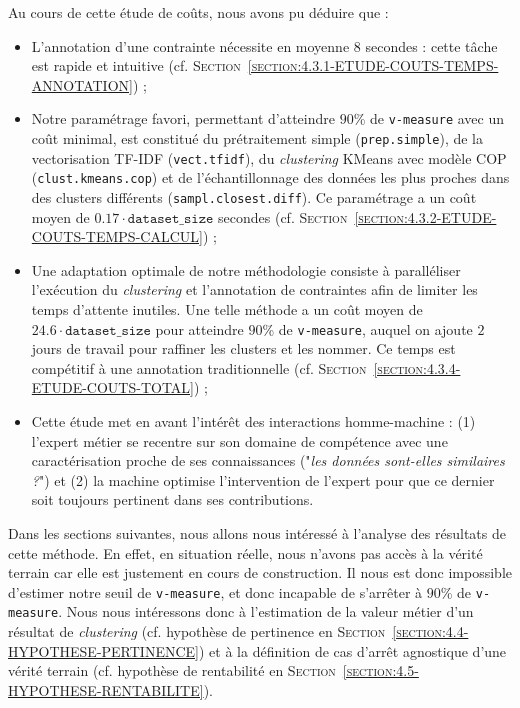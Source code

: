 			\begin{leftBarSummary}
				Au cours de cette étude de coûts, nous avons pu déduire que :
				\begin{itemize}
					\item[\itemok] L'annotation d'une contrainte nécessite en moyenne $8$ secondes : cette tâche est rapide et intuitive (cf. \textsc{Section~\ref{section:4.3.1-ETUDE-COUTS-TEMPS-ANNOTATION}}) ;
					\item[\itemok] Notre paramétrage favori, permettant d'atteindre $90$\% de \texttt{v-measure} avec un coût minimal, est constitué du prétraitement simple (\texttt{prep.simple}), de la vectorisation TF-IDF (\texttt{vect.tfidf}), du \textit{clustering} KMeans avec modèle COP (\texttt{clust.kmeans.cop}) et de l'échantillonnage des données les plus proches dans des clusters différents (\texttt{sampl.closest.diff}). Ce paramétrage a un coût moyen de $0.17 \cdot \texttt{dataset\_size}$ secondes (cf. \textsc{Section~\ref{section:4.3.2-ETUDE-COUTS-TEMPS-CALCUL}}) ;
					\item[\itemok] Une adaptation optimale de notre méthodologie consiste à paralléliser l'exécution du \textit{clustering} et l'annotation de contraintes afin de limiter les temps d'attente inutiles. Une telle méthode a un coût moyen de $24.6 \cdot \texttt{dataset\_size}$ pour atteindre $90$\% de \texttt{v-measure}, auquel on ajoute $2$ jours de travail pour raffiner les clusters et les nommer. Ce temps est compétitif à une annotation traditionnelle (cf. \textsc{Section~\ref{section:4.3.4-ETUDE-COUTS-TOTAL}}) ;
					\item[\itemok] Cette étude met en avant l'intérêt des interactions homme-machine : (1) l'expert métier se recentre sur son domaine de compétence avec une caractérisation proche de ses connaissances ("\textit{les données sont-elles similaires ?}") et (2) la machine optimise l'intervention de l'expert pour que ce dernier soit toujours pertinent dans ses contributions.
				\end{itemize}
			\end{leftBarSummary}
		
		Dans les sections suivantes, nous allons nous intéressé à l'analyse des résultats de cette méthode.
		En effet, en situation réelle, nous n'avons pas accès à la vérité terrain car elle est justement en cours de construction.
		Il nous est donc impossible d'estimer notre seuil de \texttt{v-measure}, et donc incapable de s'arrêter à $90$\% de \texttt{v-measure}.
		Nous nous intéressons donc à l'estimation de la valeur métier d'un résultat de \textit{clustering} (cf. hypothèse de pertinence en \textsc{Section~\ref{section:4.4-HYPOTHESE-PERTINENCE}}) et à la définition de cas d'arrêt agnostique d'une vérité terrain (cf. hypothèse de rentabilité en \textsc{Section~\ref{section:4.5-HYPOTHESE-RENTABILITE}}).